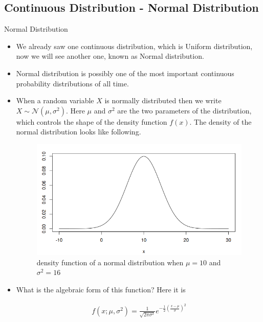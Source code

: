 \documentclass[8pt, usepdftitle=false]{beamer}
\begin{document}
\subsection{Continuous Distribution - Normal Distribution}
\frame{\subsectionpage}


\begin{frame}[allowframebreaks]{Normal Distribution}

\begin{itemize}

\item We already saw one continuous distribution, which is Uniform distribution, now we will see another one, known as \alert{Normal distribution}.

\item \alert{Normal distribution} is possibly one of the most important continuous probability distributions of all time.

\item   When a random variable $X$ is normally distributed then we write $X \sim \mathcal{N}(\mu, \sigma^2)$. Here $\mu$ and $\sigma^2$ are the \alert{two parameters} of the distribution, which controls the shape of the density function $f(x)$. The density of the normal distribution looks like following.


\begin{figure}
\centering
\includegraphics[scale = .4]{Images/pdfNormal_1.png}
\caption{density function of a normal distribution when $\mu = 10$ and $\sigma^2 = 16$}
\end{figure}

\item What is the algebraic form of this function? Here it is

\begin{align*}
f\left(x ; \mu, \sigma^2\right)=\frac{1}{\sqrt{2 \pi \sigma^2}} e^{-\frac{1}{2}\left(\frac{x-\mu}{\sigma}\right)^2}
\end{align*}




\end{itemize}
\end{frame}
\end{document}
